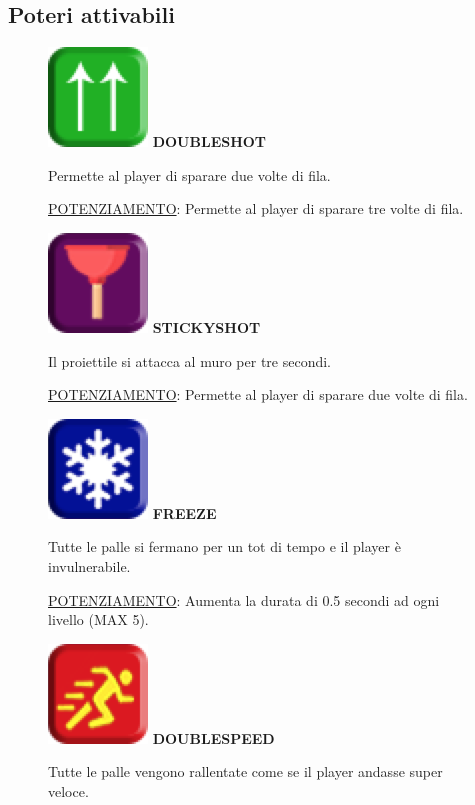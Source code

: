 \documentclass[a4paper,12pt]{report}
\begin{document}
\subsection*{Poteri attivabili}
\begin{itemize}
	\begin{figure}[H]
			\item
			\includegraphics[width=0.05\linewidth]{img/1}
			\label{img:doubleshot}
			\textbf{DOUBLESHOT}

			Permette al player di sparare due volte di fila. 

  			\underline{POTENZIAMENTO}: Permette al player di sparare tre volte di fila.
	\end{figure}
	\begin{figure}[H]
			\item
			\includegraphics[width=0.05\linewidth]{img/2}
			\label{img:sticky}
			\textbf{STICKYSHOT}

			Il proiettile si attacca al muro per tre secondi.

 			\underline{POTENZIAMENTO}: Permette al player di sparare due volte di fila.
	\end{figure}
	\begin{figure}[H]
			\item
			\includegraphics[width=0.05\linewidth]{img/3}
			\label{img:freeze}
			\textbf{FREEZE}

			Tutte le palle si fermano per un tot di tempo e il player è invulnerabile.

 			\underline{POTENZIAMENTO}: Aumenta la durata di 0.5 secondi ad ogni livello (MAX 5).
	\end{figure}
	\begin{figure}[H]
			\item
			\includegraphics[width=0.05\linewidth]{img/4}
			\label{img:doublespeed}
			\textbf{DOUBLESPEED}
			
			Tutte le palle vengono rallentate come se il player andasse super veloce.


\end{figure}
\end{itemize}
\end{document}
